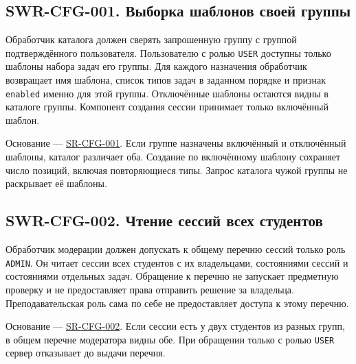 \documentclass[12pt,a4paper]{article}
\begin{document}
\subsection{SWR-CFG-001. Выборка шаблонов своей группы}\label{swr-cfg-001-ux432ux44bux431ux43eux440ux43aux430-ux448ux430ux431ux43bux43eux43dux43eux432-ux441ux432ux43eux435ux439-ux433ux440ux443ux43fux43fux44b}

\hypertarget{swr-cfg-001-выборка-шаблонов-своей-группы}{}

\hypertarget{swr-cfg-001}{}

Обработчик каталога должен сверять запрошенную группу с группой подтверждённого пользователя. Пользователю с ролью \texttt{USER} доступны только шаблоны набора задач его группы. Для каждого назначения обработчик возвращает имя шаблона, список типов задач в заданном порядке и признак \texttt{enabled} именно для этой группы. Отключённые шаблоны остаются видны в каталоге группы. Компонент создания сессии принимает только включённый шаблон.

Основание --- {\href{../04\_Системные\_требования/DOC-05\_Системные\_требования.pdf\#sr-cfg-001}{SR-CFG-001}}. Если группе назначены включённый и отключённый шаблоны, каталог различает оба. Создание по включённому шаблону сохраняет число позиций, включая повторяющиеся типы. Запрос каталога чужой группы не раскрывает её шаблоны.

\subsection{SWR-CFG-002. Чтение сессий всех студентов}\label{swr-cfg-002-ux447ux442ux435ux43dux438ux435-ux441ux435ux441ux441ux438ux439-ux432ux441ux435ux445-ux441ux442ux443ux434ux435ux43dux442ux43eux432}

\hypertarget{swr-cfg-002-чтение-сессий-всех-студентов}{}

\hypertarget{swr-cfg-002}{}

Обработчик модерации должен допускать к общему перечню сессий только роль \texttt{ADMIN}. Он читает сессии всех студентов с их владельцами, состояниями сессий и состояниями отдельных задач. Обращение к перечню не запускает предметную проверку и не предоставляет права отправить решение за владельца. Преподавательская роль сама по себе не предоставляет доступа к этому перечню.

Основание --- {\href{../04\_Системные\_требования/DOC-05\_Системные\_требования.pdf\#sr-cfg-002}{SR-CFG-002}}. Если сессии есть у двух студентов из разных групп, в общем перечне модератора видны обе. При обращении только с ролью \texttt{USER} сервер отказывает до выдачи перечня.
\end{document}
